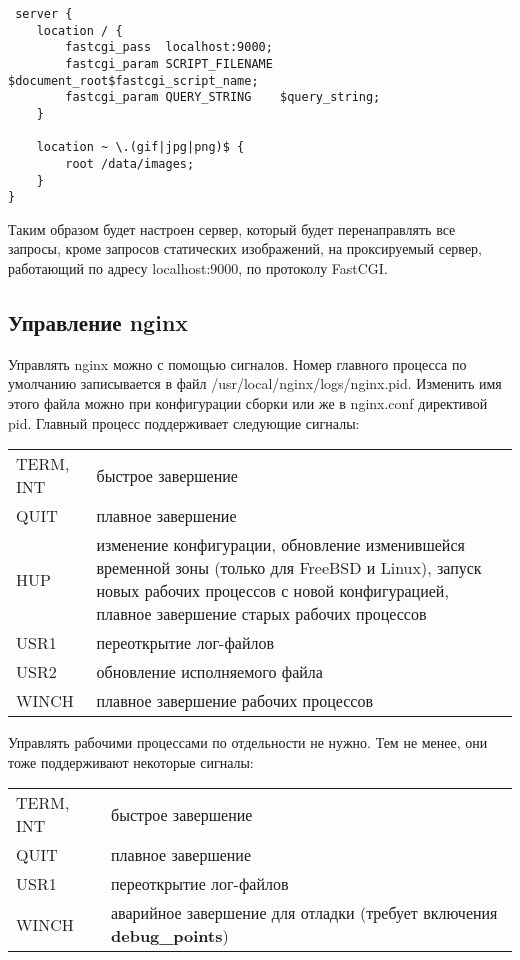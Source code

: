 \documentclass[a4paper,10pt,twoside]{article}
\begin{document}
\begin{verbatim}
 server {
    location / {
        fastcgi_pass  localhost:9000;
        fastcgi_param SCRIPT_FILENAME $document_root$fastcgi_script_name;
        fastcgi_param QUERY_STRING    $query_string;
    }

    location ~ \.(gif|jpg|png)$ {
        root /data/images;
    }
}
\end{verbatim} 
Таким образом будет настроен сервер, который будет перенаправлять все запросы, кроме запросов статических изображений, на проксируемый сервер, работающий по адресу localhost:9000, по протоколу FastCGI.


\subsection{Управление nginx}
Управлять nginx можно с помощью сигналов. Номер главного процесса по умолчанию записывается в файл /usr/local/nginx/logs/nginx.pid. Изменить имя этого файла можно при конфигурации сборки или же в nginx.conf директивой pid. Главный процесс поддерживает следующие сигналы:

\begin{longtable}{  m{5cm}  m{10cm}  }  
TERM, INT & быстрое завершение\\
QUIT & плавное завершение\\
HUP & изменение конфигурации, обновление изменившейся временной зоны (только для FreeBSD и Linux), запуск новых рабочих процессов с новой конфигурацией, плавное завершение старых рабочих процессов\\
USR1 & переоткрытие лог-файлов\\
USR2 & обновление исполняемого файла\\
WINCH & плавное завершение рабочих процессов\\
\end{longtable}
Управлять рабочими процессами по отдельности не нужно. Тем не менее, они тоже поддерживают некоторые сигналы:

\begin{longtable}{  m{5cm}  m{10cm}  }
TERM, INT & быстрое завершение\\
QUIT & плавное завершение\\
USR1 & переоткрытие лог-файлов\\
WINCH & аварийное завершение для отладки (требует включения \textbf{debug\_points})\\
\end{longtable}
\end{document}
